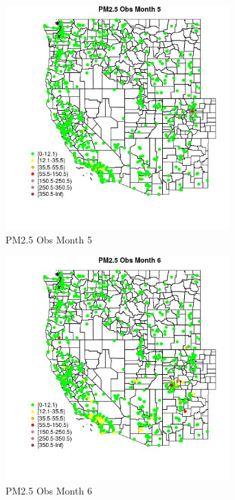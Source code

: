 \begin{figure} 
\centering  
\includegraphics[width=0.77\textwidth]{Code_Outputs/Report_ML_input_PM25_Step4_part_e_de_duplicated_aves_compiled_2019-05-21wNAs_MapObsMo5PM25_Obs.jpg} 
\caption{\label{fig:Report_ML_input_PM25_Step4_part_e_de_duplicated_aves_compiled_2019-05-21wNAsMapObsMo5PM25_Obs}PM2.5 Obs Month 5} 
\end{figure} 
 

\begin{figure} 
\centering  
\includegraphics[width=0.77\textwidth]{Code_Outputs/Report_ML_input_PM25_Step4_part_e_de_duplicated_aves_compiled_2019-05-21wNAs_MapObsMo6PM25_Obs.jpg} 
\caption{\label{fig:Report_ML_input_PM25_Step4_part_e_de_duplicated_aves_compiled_2019-05-21wNAsMapObsMo6PM25_Obs}PM2.5 Obs Month 6} 
\end{figure} 
 

